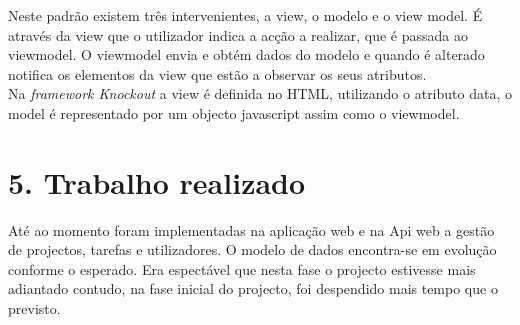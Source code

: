 \documentclass[]{article}
\begin{document}
Neste padrão existem três intervenientes, a view, o modelo e o view model. É através da view que o utilizador indica a acção a realizar, que é passada ao viewmodel. O viewmodel envia e obtém dados do modelo e quando é alterado notifica os elementos da view que estão a observar os seus atributos.\\

Na \emph{framework Knockout}\cite{knockout} a view é definida no HTML, utilizando o atributo data, o model é representado por um objecto javascript assim como o viewmodel.
\newpage
\section{5. Trabalho realizado}
Até ao momento foram implementadas na aplicação web e na Api web a gestão de projectos, tarefas e utilizadores. O modelo de dados encontra-se em evolução conforme o esperado.
Era espectável que nesta fase o projecto estivesse mais adiantado contudo, na fase inicial do projecto, foi despendido mais tempo que o previsto.\\
\end{document}
